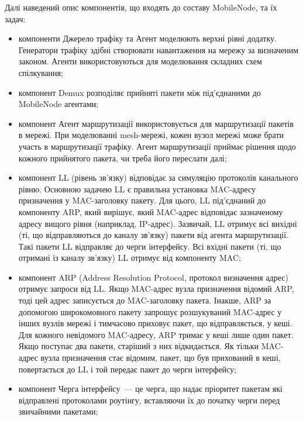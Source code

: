 \documentclass[a4paper,ukrainian,utf8,nocolumnsxix,nocolumnxxxii,nocolumnxxxi,floatsection,equationsection]{eskdtext}
\begin{document}
Далі наведений опис компонентів, що входять до составу MobileNode, та їх задач:

\begin{itemize}
	\item компоненти Джерело трафіку та Агент моделюють верхні рівні додатку. Генератори трафіку здібні створювати навантаження на мережу за визначеним законом. Агенти використовуються для моделювання складних схем спілкування;

	\item компонент Demux розподіляє прийняті пакети між під'єднаними до MobileNode агентами;

	\item компонент Агент маршрутизації використовується для маршрутизації пакетів в мережі. При моделюванні mesh-мережі, кожен вузол мережі може брати участь в маршрутизації трафіку. Агент маршрутизації приймає рішення щодо кожного прийнятого пакета, чи треба його переслати далі;

	\item компонент LL (рівень зв'язку) відповідає за симуляцію протоколів канального рівню. Основною задачею LL є правильна установка MAC-адресу призначення у MAC-заголовку пакету. Для цього, LL під’єднаний до компоненту ARP, який вирішує, який MAC-адрес відповідає зазначеному адресу вищого рівня (наприклад, IP-адрес). Зазвичай, LL отримує всі вихідні (ті, що відправляються до каналу зв'язку) пакети від агента маршрутизації. Такі пакети LL відправляє до черги інтерфейсу. Всі вхідні пакети (ті, що отримані із каналу зв'язку) LL отримує від компоненту MAC;

	\item компонент ARP (Address Resolution Protocol, протокол визначення адрес) отримує запроси від LL. Якщо MAC-адрес вузла призначення відомий ARP, тоді цей адрес записується до MAC-заголовку пакета. Інакше, ARP за допомогою широкомовного пакету запрошує розшукуваний MAC-адрес у інших вузлів мережі і тимчасово приховує пакет, що відправляється, у кеші. Для кожного невідомого MAC-адресу, ARP тримає у кеші лише один пакет. Якщо поступає два пакети, старіший з них відкидається. Як тільки MAC-адрес вузла призначення стає відомим, пакет, що був прихований в кеші, повертається до LL і той передає пакет до черги інтерфейсу;

	\item компонент Черга інтерфейсу~--- це черга, що надає пріоритет пакетам які відправлені протоколами роутінгу, вставляючи їх до початку черги перед звичайними пакетами;


\end{itemize}
\end{document}
